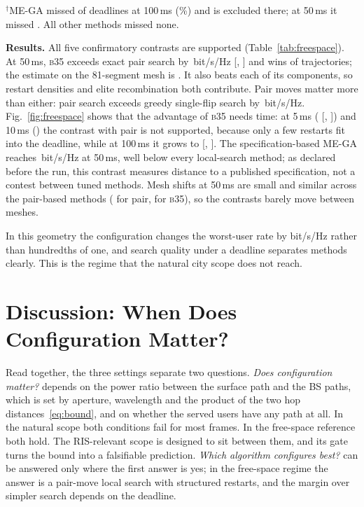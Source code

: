 \documentclass[runningheads]{llncs}
\newcommand{\bthreefive}{\textsc{b35}}
\begin{document}
\begin{table}[t]
\smallskip\scriptsize $^\dagger$ME-GA missed  of  deadlines at 100\,ms (\%) and is excluded there; at 50\,ms it missed . All other methods missed none.
\end{table}

\textbf{Results.} All five confirmatory contrasts are supported (Table~\ref{tab:freespace}). At 50\,ms, \bthreefive{} exceeds exact pair search by \,bit/s/Hz [, ] and wins  of  trajectories; the estimate on the 81-segment mesh is . It also beats each of its components, so restart densities and elite recombination both contribute. Pair moves matter more than either: pair search exceeds greedy single-flip search by \,bit/s/Hz. Fig.~\ref{fig:freespace} shows that the advantage of \bthreefive{} needs time: at 5\,ms ( [, ]) and 10\,ms () the contrast with pair is not supported, because only a few restarts fit into the deadline, while at 100\,ms it grows to  [, ]. The specification-based ME-GA reaches \,bit/s/Hz at 50\,ms, well below every local-search method; as declared before the run, this contrast measures distance to a published specification, not a contest between tuned methods. Mesh shifts at 50\,ms are small and similar across the pair-based methods ( for pair,  for \bthreefive{}), so the contrasts barely move between meshes.

In this geometry the configuration changes the worst-user rate by bit/s/Hz rather than hundredths of one, and search quality under a deadline separates methods clearly. This is the regime that the natural city scope does not reach.

\section{Discussion: When Does Configuration Matter?}\label{sec:discussion}
Read together, the three settings separate two questions. \emph{Does configuration matter?} depends on the power ratio between the surface path and the BS paths, which is set by aperture, wavelength and the product of the two hop distances~\eqref{eq:bound}, and on whether the served users have any path at all. In the natural scope both conditions fail for most frames. In the free-space reference both hold. The RIS-relevant scope is designed to sit between them, and its gate turns the bound into a falsifiable prediction. \emph{Which algorithm configures best?} can be answered only where the first answer is yes; in the free-space regime the answer is a pair-move local search with structured restarts, and the margin over simpler search depends on the deadline.
\end{document}
